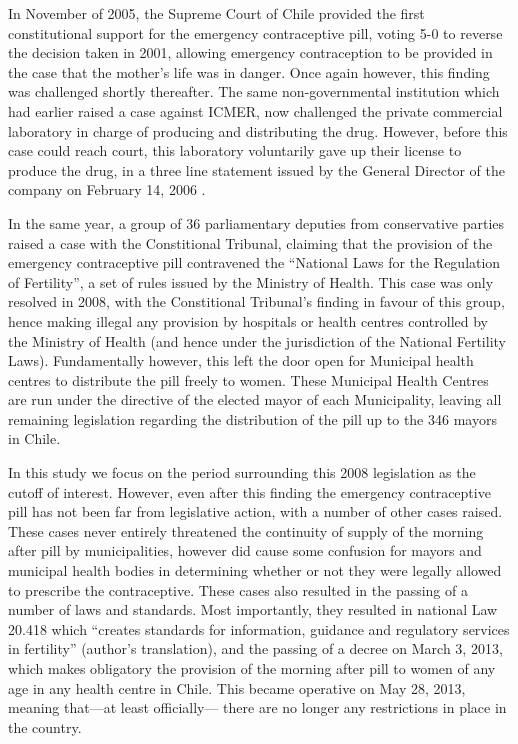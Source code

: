 \documentclass[11pt,subeqn]{article}
\begin{document}
\begin{spacing}{1.4}
In November of 2005, the Supreme Court of Chile provided the first 
constitutional support for the emergency contraceptive pill, voting 5-0 to
reverse the decision taken in 2001, allowing emergency contraception to be
provided in the case that the mother's life was in danger.  Once again however,
this finding was challenged shortly thereafter.  The same non-governmental 
institution which had earlier raised a case against ICMER, now challenged the 
private commercial laboratory in charge of producing and distributing the drug.  
However, before this case could reach court, this laboratory voluntarily gave 
up their license to produce the drug, in a three line statement issued by the
General Director of the company on February 14, 2006 \citep{CasasBecerra2008}.

In the same year, a group of 36 parliamentary deputies from conservative 
parties raised a case with the Constitional Tribunal, claiming that the 
provision of the emergency contraceptive pill contravened the ``National Laws
for the Regulation of Fertility'', a set of rules issued by the Ministry of
Health.  This case was only resolved in 2008, with the Constitional Tribunal's
finding in favour of this group, hence making illegal any provision by 
hospitals or health centres controlled by the Ministry of Health (and hence
under the jurisdiction of the National Fertility Laws).  Fundamentally however,
this left the door open for Municipal health centres to distribute the pill
freely to women.  These Municipal Health Centres are run under the directive
of the elected mayor of each Municipality, leaving all remaining legislation 
regarding the distribution of the pill up to the 346 mayors in Chile.

In this study we focus on the period surrounding this 2008 legislation as the 
cutoff of interest.  However, even after this finding the emergency 
contraceptive pill has not been far from legislative action, with a number of
other cases raised.  These cases never entirely threatened the continuity of
supply of the morning after pill by municipalities, however did cause some
confusion for mayors and municipal health bodies in determining whether or not
they were legally allowed to prescribe the contraceptive.  These cases also
resulted in the passing of a number of laws and standards.  Most importantly,
they resulted in national Law 20.418 which ``creates standards for information,
guidance and regulatory services in fertility'' (author's translation), and 
the passing of a decree on March 3, 2013, which makes obligatory the provision
of the morning after pill to women of any age in any health centre in Chile.  
This became operative on May 28, 2013, meaning that---at least officially---%
there are no longer any restrictions in place in the country.


\end{spacing}
\end{document}
